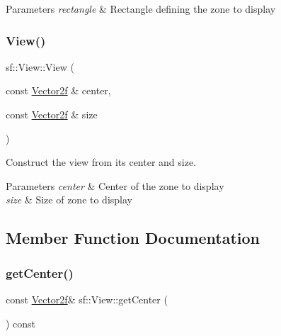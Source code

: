 \begin{DoxyParams}{Parameters}
{\em rectangle} & Rectangle defining the zone to display \\
\hline
\end{DoxyParams}
\mbox{\label{classsf_1_1_view_afdaf84cfc910ef160450d63603457ea4}} 
\subsubsection{\texorpdfstring{View()}{View()}\hspace{0.1cm}{\footnotesize\ttfamily [3/3]}}
{\footnotesize\ttfamily sf\+::\+View\+::\+View (\begin{DoxyParamCaption}\item[{const \hyperlink{classsf_1_1_vector2}{Vector2f} \&}]{center,  }\item[{const \hyperlink{classsf_1_1_vector2}{Vector2f} \&}]{size }\end{DoxyParamCaption})}



Construct the view from its center and size. 


\begin{DoxyParams}{Parameters}
{\em center} & Center of the zone to display \\
\hline
{\em size} & Size of zone to display \\
\hline
\end{DoxyParams}


\subsection{Member Function Documentation}
\mbox{\label{classsf_1_1_view_a7f4443c194c691ae4dcf8fd9dd0eaa46}} 
\subsubsection{\texorpdfstring{get\+Center()}{getCenter()}}
{\footnotesize\ttfamily const \hyperlink{classsf_1_1_vector2}{Vector2f}\& sf\+::\+View\+::get\+Center (\begin{DoxyParamCaption}{ }\end{DoxyParamCaption}) const}



